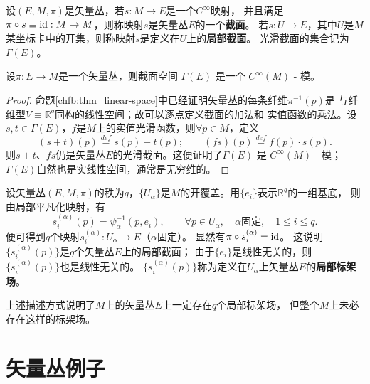 
\begin{definition}\label{chfb:def_vf-section}
    设$(E,M,\pi)$是矢量丛，若$s:M\to E$是一个$C^\infty$映射，
    并且满足$\pi \circ s \equiv {\rm id} :M\to M$，则称映射$s$是矢量丛$E$的一个\textbf{截面}。
    若$s:U\to E$，其中$U$是$M$某坐标卡中的开集，则称映射$s$是定义在$U$上的\textbf{局部截面}。
    光滑截面的集合记为$\Gamma(E)$。
\end{definition}

\begin{proposition}
    设$\pi: E \rightarrow M$是一个矢量丛，则截面空间 $\Gamma(E)$ 是一个 $C^{\infty}(M)$ - 模。
\end{proposition}

\begin{proof}
    命题\ref{chfb:thm_linear-space}中已经证明矢量丛的每条纤维$\pi^{-1}(p)$是
    与纤维型$V\equiv \mathbb{R}^q$同构的线性空间；故可以逐点定义截面的加法和
    实值函数的乘法。设$s,t\in \Gamma(E)$，$f$是$M$上的实值光滑函数，则$\forall p\in M$，定义
    \begin{equation}\label{chfb:eqn_spt}
        (s+t)(p)\overset{def}{=} s(p) + t(p);\qquad
        (fs)(p) \overset{def}{=} f(p) \cdot s(p) .
    \end{equation}
    则$s+t$、$fs$仍是矢量丛$E$的光滑截面。这便证明了$\Gamma(E)$ 是 $C^{\infty}(M)$ - 模；
    $\Gamma(E)$自然也是实线性空间，通常是无穷维的。
\end{proof}

设矢量丛$(E,M,\pi)$的秩为$q$，$\{U_\alpha\}$是$M$的开覆盖。用$\{e_i\}$表示$\mathbb{R}^q$的一组基底，
则由局部平凡化映射，有
\begin{equation}\label{chfb:eqn_spsie}
    s_i^{(\alpha)}(p) = \psi^{-1}_{\alpha}(p, e_i),\qquad \forall p\in U_\alpha,
    \quad \alpha \text{固定}, \quad 1 \leqslant i \leqslant q.
\end{equation}
便可得到$q$个映射$s_i^{(\alpha)} : U_\alpha \to E$（$\alpha$固定）。
显然有$\pi \circ s_i^{(\alpha)} ={\rm id}$。
这说明$\{s_i^{(\alpha)}(p)\}$是$q$个矢量丛$E$上的局部截面；
由于$\{e_i\}$是线性无关的，则$\{s_i^{(\alpha)}(p)\}$也是线性无关的。
$\{s_i^{(\alpha)}(p)\}$称为定义在$U_\alpha$上矢量丛$E$的\textbf{局部标架场}。

上述描述方式说明了$M$上的矢量丛$E$上一定存在$q$个局部标架场，
但整个$M$上未必存在这样的标架场。




\section{矢量丛例子}

